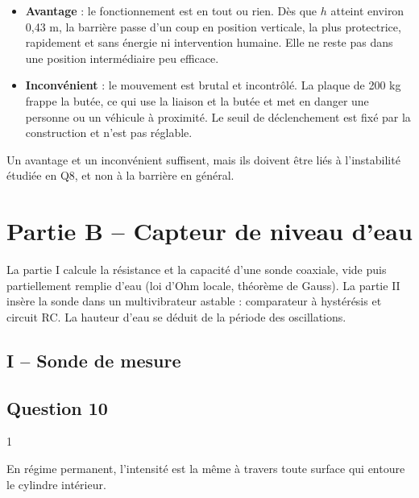 \documentclass[11pt,a4paper]{article}
\providecommand{\tightlist}{\setlength{\itemsep}{0pt}\setlength{\parskip}{0pt}}
\begin{document}
\begin{itemize}
\tightlist
\item
  \textbf{Avantage} : le fonctionnement est en tout ou rien. Dès que \(h\) atteint environ 0,43 m, la barrière passe d'un coup en position verticale, la plus protectrice, rapidement et sans énergie ni intervention humaine. Elle ne reste pas dans une position intermédiaire peu efficace.
\item
  \textbf{Inconvénient} : le mouvement est brutal et incontrôlé. La plaque de 200 kg frappe la butée, ce qui use la liaison et la butée et met en danger une personne ou un véhicule à proximité. Le seuil de déclenchement est fixé par la construction et n'est pas réglable.
\end{itemize}

\begin{jury}

Un avantage et un inconvénient suffisent, mais ils doivent être liés à l'instabilité étudiée en Q8, et non à la barrière en général.

\end{jury}

\hypertarget{partie-b-capteur-de-niveau-deau}{%
\section{Partie B -- Capteur de niveau d'eau}\label{partie-b-capteur-de-niveau-deau}}

La partie I calcule la résistance et la capacité d'une sonde coaxiale, vide puis partiellement remplie d'eau (loi d'Ohm locale, théorème de Gauss). La partie II insère la sonde dans un multivibrateur astable : comparateur à hystérésis et circuit RC. La hauteur d'eau se déduit de la période des oscillations.

\hypertarget{i-sonde-de-mesure}{%
\subsection{I -- Sonde de mesure}\label{i-sonde-de-mesure}}

\hypertarget{question-10}{%
\subsection{Question 10}\label{question-10}}

\begin{indication}{1}

En régime permanent, l'intensité est la même à travers toute surface qui entoure le cylindre intérieur.

\end{indication}
\end{document}
